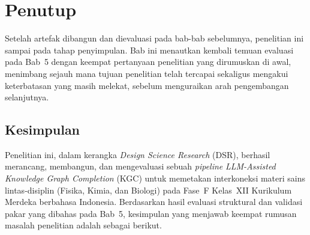 \documentclass[../../thesis]{subfiles}
\begin{document}
\ifSubfilesClassLoaded{}{\setcounter{chapter}{5}}

\chapter{Penutup}\label{sec:penutup}

Setelah artefak dibangun dan dievaluasi pada bab-bab sebelumnya, penelitian ini
sampai pada tahap penyimpulan. Bab ini menautkan kembali temuan evaluasi pada
Bab~5 dengan keempat pertanyaan penelitian yang dirumuskan di awal, menimbang
sejauh mana tujuan penelitian telah tercapai sekaligus mengakui keterbatasan
yang masih melekat, sebelum menguraikan arah pengembangan selanjutnya.

\section{Kesimpulan}

Penelitian ini, dalam kerangka \textit{Design Science Research} (DSR), berhasil
merancang, membangun, dan mengevaluasi sebuah \textit{pipeline}
\textit{LLM-Assisted Knowledge Graph Completion} (KGC) untuk memetakan
interkoneksi materi sains lintas-disiplin (Fisika, Kimia, dan Biologi) pada
Fase~F Kelas~XII Kurikulum Merdeka berbahasa Indonesia. Berdasarkan hasil
evaluasi struktural dan validasi pakar yang dibahas pada Bab~5, kesimpulan yang
menjawab keempat rumusan masalah penelitian adalah sebagai berikut.
\end{document}
